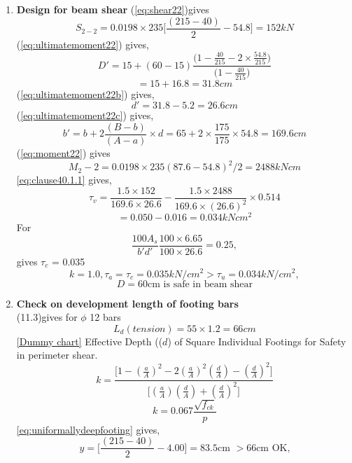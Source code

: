 \begin{enumerate}
\item  \textbf{Design for beam shear}
  \equmacro (\ref{eq:shear22})gives
  $$S_{2-2}=0.0198\times235\Bigg[\frac{(215-40)}{2}-54.8\Bigg]=152 kN$$
  \equmacro (\ref{eq:ultimatemoment22}) gives,
  $$D'=15+(60-15)\frac{\Bigg(1-\frac{40}{215}-2\times \frac{54.8}{215}\Bigg)}{\Bigg(1-\frac{40}{215}\Bigg)}$$
  $$=15+16.8=31.8 cm$$
  \equmacro (\ref{eq:ultimatemoment22b}) gives,
  $$ d'=31.8-5.2=26.6 cm$$
 \equmacro (\ref{eq:ultimatemoment22c}) gives,
  $$b'=b+2\frac{(B-b)}{(A-a)}\times d=65+2\times \frac{175}{175}\times 54.8=169.6 cm$$
  \equmacro (\ref{eq:moment22}) gives
  $$M_2-2=0.0198\times 235(87.6-54.8)^2/2=2488 kN cm$$ 
  \equmacro \ref{eq:clause40.1.1} gives,
  $$\tau_v=\frac{1.5\times 152}{169.6\times26.6}-\frac{1.5\times 2488}{169.6\times (26.6)^2}\times 0.514$$
  $$=0.050-0.016=0.034 kN cm^2$$
  For
  $$\frac{100A_s}{b'd'}\frac{100\times6.65}{100\times26.6}=0.25,$$
   gives ${\tau_c}$ = 0.035 
  $$k=1.0,  {\tau_a}= {\tau_c}=0.035 kN/cm^2>{\tau_u}=0.034 kN/cm^2,$$
$$D=60 \text{cm is safe in beam shear}$$  
  
\item  \textbf{Check on development length of footing bars}\\
\tablemacro (11.3)gives for $\phi$ 12 bars
$$L_d (tension)=55\times1.2=66cm$$
\chartmacro \ref{Dummy chart} Effective Depth (($d$) of Square Individual Footings for Safety in perimeter shear.
$$k=\frac{\Bigg[1-\left(\frac{a}{A}\right)^2
-2\left(\frac{a}{A}\right)^2\left( \frac{d}{A}\right)-\left(\frac{d}{A}\right)^2\Bigg]}{\Bigg[\left(\frac{a}{A}\right)\left(\frac{d}{A}\right)+\left(\frac{d}{A}\right)^2\Bigg]}$$
$$k=0.067\frac{\sqrt{f_{ck}}}{p}$$
\equmacro \ref{eq:uniformallydeepfooting} gives,
$$y=\Bigg[\frac{(215-40)}{2}-4.00\Bigg]=83.5 \text{cm } > 66 \text{cm OK,}$$
\end{enumerate}
